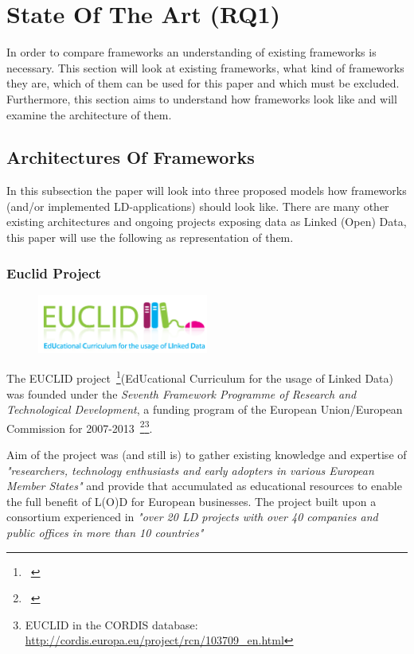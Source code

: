 \chapter{State Of The Art (RQ1)}

In order to compare frameworks an understanding of existing frameworks is necessary. This section will look at existing frameworks, what kind of frameworks they are, which of them can be used for this paper and which must be excluded. Furthermore, this section aims to understand how frameworks look like and will examine the architecture of them.

\section{Architectures Of Frameworks}

In this subsection the paper will look into three proposed models how frameworks (and/or implemented LD-applications) should look like. There are many other existing architectures and ongoing projects exposing data as Linked (Open) Data, this paper will use the following as representation of them.

\subsection{Euclid Project}

\begin{figure}[h]
	\centering
\includegraphics[width=0.5\textwidth]{img/euclid_logo.png}
\end{figure}

The EUCLID project~\footnote{~\cite{euclid:home}}(EdUcational Curriculum for the usage of Linked Data) was founded under the \emph{Seventh Framework Programme of Research and Technological Development}, a funding program of the European Union/European Commission for 2007-2013~\footnote{~\cite{eu:fp7}}\footnote{EUCLID in the CORDIS database: \url{http://cordis.europa.eu/project/rcn/103709_en.html}}.

Aim of the project was (and still is) to gather existing knowledge and expertise of \emph{"researchers, technology enthusiasts and early adopters in various European Member States"} and provide that accumulated as educational resources to enable the  full benefit of L(O)D for European businesses. The project built upon a consortium experienced in \emph{"over 20 LD projects with over 40 companies and public offices in more than 10 countries"}~\cite{euclid:about}

